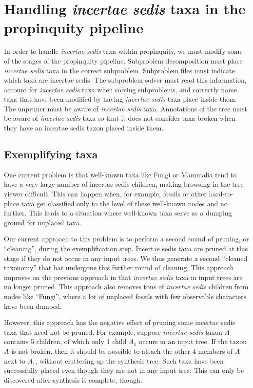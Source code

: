 \documentclass[english]{article}
\begin{document}
\section{Handling \emph{incertae sedis} taxa in the propinquity
pipeline}

In order to handle \emph{incertae sedis} taxa within propinquity, we
must modify some of the stages of the propinquity pipeline. Subproblem
decomposition must place \emph{incertae sedis} taxa in the correct
subproblem. Subproblem files must indicate which taxa are incertae
sedis. The subproblem solver must read this information, account for
\emph{incertae sedis} taxa when solving subproblems, and correctly
name taxa that have been modified by having \emph{incertae sedis} taxa
place inside them. The unpruner must be aware of \emph{incertae sedis}
taxa. Annotations of the tree must be aware of \emph{incertae sedis}
taxa so that it does not consider taxa broken when they have an
incertae sedis taxon placed inside them.

\subsection{Exemplifying taxa}

One current problem is that well-known taxa like Fungi or Mammalia
tend to have a very large number of incertae sedis children, making
browsing in the tree viewer difficult. This can happen when, for
example, fossils or other hard-to- place taxa get classified only to
the level of these well-known nodes and no further. This leads to a
situation where well-known taxa serve as a dumping ground for unplaced
taxa.

Our current approach to this problem is to perform a second round of
pruning, or ``cleaning'', during the exemplification step. Incertae
sedis taxa are pruned at this stage if they do not occur in any input
trees. We thus generate a second ``cleaned taxonomy'' that has
undergone this further round of cleaning. This approach improves on
the previous approach in that \emph{incertae sedis} taxa in input
trees are no longer pruned. This approach also removes tons of
\emph{incertae sedis} children from nodes like ``Fungi'', where a lot
of unplaced fossils with few observable characters have been dumped.

However, this approach has the negative effect of pruning some
incertae sedis taxa that need not be pruned. For example, suppose
\emph{incertae sedis} taxon $A$ contains 5 children, of which only 1
child $A_{1}$ occurs in an input tree. If the taxon $A$ is not broken,
then it should be possible to attach the other 4 members of $A$ next
to $A_{1}$, without cluttering up the synthesis tree. Such taxa have
been successfully placed even though they are not in any input tree.
This can only be discovered after synthesis is complete, though.
\end{document}
